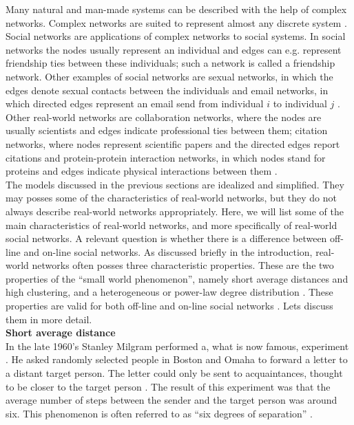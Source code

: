 \documentclass[11 pt , letterpaper , twoside , openright]{book}
\begin{document}
Many natural and man-made systems can be described with the help of complex networks. Complex networks are suited to represent almost any discrete system \cite{Costa2008}. Social networks are applications of complex networks to social systems. In social networks the nodes usually represent an individual and edges can e.g. represent friendship ties between these individuals; such a network is called a friendship network. Other examples of social networks are sexual networks, in which the edges denote sexual contacts between the individuals and email networks, in which directed edges represent an email send from individual $i$ to individual $j$ \cite{Costa2008}. Other real-world networks are collaboration networks, where the nodes are usually scientists and edges indicate professional ties between them; citation networks, where nodes represent scientific papers and the directed edges report citations and protein-protein interaction networks, in which nodes stand for proteins and edges indicate physical interactions between them \cite{Costa2008}.\\
\newline
The models discussed in the previous sections are idealized and simplified. They may posses some of the characteristics of real-world networks, but they do not always describe real-world networks appropriately. Here, we will list some of the main characteristics of real-world networks, and more specifically of real-world social networks. A relevant question is whether there is a difference between off-line and on-line social networks.
\newpage
\noindent
As discussed briefly in the introduction, real-world networks often posses three characteristic properties. These are the two properties of the ``small world phenomenon'', namely short average distances and high clustering, and a heterogeneous or power-law degree distribution \cite{RealWorld}. These properties are valid for both off-line and on-line social networks \cite{Zhang2014}. Lets discuss them in more detail.\\
\newline
\textbf{Short average distance}\\
\newline
In the late 1960's Stanley Milgram performed a, what is now famous, experiment \cite{Newman2003}. He asked randomly selected people in Boston and Omaha to forward a letter to a distant target person. The letter could only be sent to acquaintances, thought to be closer to the target person \cite{RealWorld}. The result of this experiment was that the average number of steps between the sender and the target person was around six. This phenomenon is often referred to as ``six degrees of separation'' \cite{RealWorld}.\\
\end{document}
